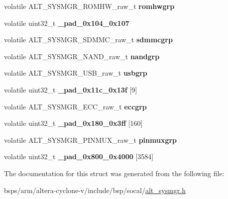 \begin{DoxyCompactItemize}
\item 
\mbox{\label{structALT__SYSMGR__raw__s_a4bab4d9ded8e82097946645b03fd4560}} 
volatile A\+L\+T\+\_\+\+S\+Y\+S\+M\+G\+R\+\_\+\+R\+O\+M\+H\+W\+\_\+raw\+\_\+t {\bfseries romhwgrp}
\item 
\mbox{\label{structALT__SYSMGR__raw__s_ab069df5d0b3134c99c7292a06b52d7c3}} 
volatile uint32\+\_\+t {\bfseries \+\_\+pad\+\_\+0x104\+\_\+0x107}
\item 
\mbox{\label{structALT__SYSMGR__raw__s_a62f671acd9239aa1bcb5408e7a312209}} 
volatile A\+L\+T\+\_\+\+S\+Y\+S\+M\+G\+R\+\_\+\+S\+D\+M\+M\+C\+\_\+raw\+\_\+t {\bfseries sdmmcgrp}
\item 
\mbox{\label{structALT__SYSMGR__raw__s_af190b3ad85f82aa17f6cf01009964bb4}} 
volatile A\+L\+T\+\_\+\+S\+Y\+S\+M\+G\+R\+\_\+\+N\+A\+N\+D\+\_\+raw\+\_\+t {\bfseries nandgrp}
\item 
\mbox{\label{structALT__SYSMGR__raw__s_a2855a101c7687f304473cc71c31abd8f}} 
volatile A\+L\+T\+\_\+\+S\+Y\+S\+M\+G\+R\+\_\+\+U\+S\+B\+\_\+raw\+\_\+t {\bfseries usbgrp}
\item 
\mbox{\label{structALT__SYSMGR__raw__s_a70dc72c855e64c4dc0065c22d4f17de1}} 
volatile uint32\+\_\+t {\bfseries \+\_\+pad\+\_\+0x11c\+\_\+0x13f} \mbox{[}9\mbox{]}
\item 
\mbox{\label{structALT__SYSMGR__raw__s_acdff90a3318864a19807186ea3bd9f19}} 
volatile A\+L\+T\+\_\+\+S\+Y\+S\+M\+G\+R\+\_\+\+E\+C\+C\+\_\+raw\+\_\+t {\bfseries eccgrp}
\item 
\mbox{\label{structALT__SYSMGR__raw__s_a529fbda301d3cac3fae84839fb330070}} 
volatile uint32\+\_\+t {\bfseries \+\_\+pad\+\_\+0x180\+\_\+0x3ff} \mbox{[}160\mbox{]}
\item 
\mbox{\label{structALT__SYSMGR__raw__s_ad1f9c68ae373d6403ea54d8561814adb}} 
volatile A\+L\+T\+\_\+\+S\+Y\+S\+M\+G\+R\+\_\+\+P\+I\+N\+M\+U\+X\+\_\+raw\+\_\+t {\bfseries pinmuxgrp}
\item 
\mbox{\label{structALT__SYSMGR__raw__s_a2fe4993f4e14ea878423cd38fab7c7e1}} 
volatile uint32\+\_\+t {\bfseries \+\_\+pad\+\_\+0x800\+\_\+0x4000} \mbox{[}3584\mbox{]}
\end{DoxyCompactItemize}


The documentation for this struct was generated from the following file\+:\begin{DoxyCompactItemize}
\item 
bsps/arm/altera-\/cyclone-\/v/include/bsp/socal/\mbox{\hyperlink{alt__sysmgr_8h}{alt\+\_\+sysmgr.\+h}}\end{DoxyCompactItemize}
